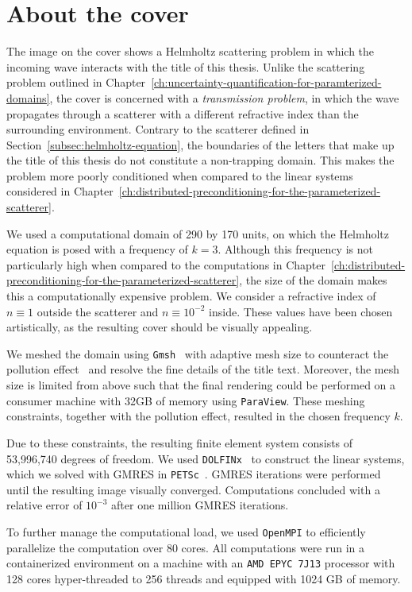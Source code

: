 \chapter*{About the cover}


The image on the cover shows a Helmholtz scattering problem in which the incoming wave interacts with the title of this thesis.
Unlike the scattering problem outlined in Chapter~\ref{ch:uncertainty-quantification-for-paramterized-domains}, the cover is concerned with a \emph{transmission problem}, in which the wave propagates through a scatterer with a different refractive index than the surrounding environment.
Contrary to the scatterer defined in Section~\ref{subsec:helmholtz-equation}, the boundaries of the letters that make up the title of this thesis do not constitute a non-trapping domain.
This makes the problem more poorly conditioned when compared to the linear systems considered in Chapter~\ref{ch:distributed-preconditioning-for-the-parameterized-scatterer}.

We used a computational domain of 290 by 170 units, on which the Helmholtz equation is posed with a frequency of $k=3$.
Although this frequency is not particularly high when compared to the computations in Chapter~\ref{ch:distributed-preconditioning-for-the-parameterized-scatterer}, the size of the domain makes this a computationally expensive problem.
We consider a refractive index of $ n\equiv 1$ outside the scatterer and $n\equiv 10^{-2}$ inside.
These values have been chosen artistically, as the resulting cover should be visually appealing.

We meshed the domain using \texttt{Gmsh}~\cite{geuzaine2009} with adaptive mesh size to counteract the pollution effect~\cite{babuska1997} and resolve the fine details of the title text.
Moreover, the mesh size is limited from above such that the final rendering could be performed on a consumer machine with 32GB of memory using \texttt{ParaView}.
These meshing constraints, together with the pollution effect, resulted in the chosen frequency $k$.

Due to these constraints, the resulting finite element system consists of 53,996,740 degrees of freedom.
We used \texttt{DOLFINx}~\cite{alnaes2014a,baratta2023,scroggs2022,scroggs2022a} to construct the linear systems, which we solved with GMRES in \texttt{PETSc}~\cite{brown2022}.
GMRES iterations were performed until the resulting image visually converged.
Computations concluded with a relative error of $10^{-3}$ after one million GMRES iterations.

To further manage the computational load, we used \texttt{OpenMPI} to efficiently parallelize the computation over 80 cores.
All computations were run in a containerized environment on a machine with an \texttt{AMD EPYC 7J13} processor with 128 cores hyper-threaded to 256 threads and equipped with 1024 GB of memory.